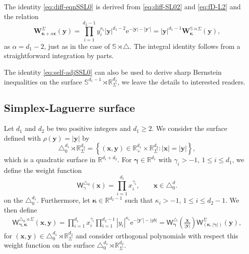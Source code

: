 \documentclass{amsart}
\theoremstyle{remark}
\def\la{{\langle}}
\def\ra{{\rangle}}
\def\d{\mathrm{d}}
\def\e{\mathrm{e}}
\def\sb{{\mathsf b}}
\def\sW{{\mathsf W}}
\def\a{{\alpha}}
\def\g{{\gamma}}
\def\k{{\kappa}}
\def\s{\sigma}
\def\la{{\langle}}
\def\ra{{\rangle}}
\def\xb{{\bm x}}
\def\yb{{\bm y}}
\def\Wb{{\bm W}}
\def\RR{{\mathbb R}}
\def\SS{{\mathbb S}}
\def\bep{{\boldsymbol{\epsilon}}}
\def\bg{{\boldsymbol{\gamma}}}
\def\bk{{\boldsymbol{\kappa}}}
\begin{document}
The identity \eqref{eq:diff-eqnSSL0} is derived from \eqref{eq:diff-SL02} and \eqref{eq:fD-L2} and the relation
$$
  \Wb_{\bk+\a \bep}^\Sigma(\yb) = \prod_{i=1}^{d_2 -1} y_i^{\k_i} |\yb|^{d_1-2} \e^{-|\yb|-|\yb'|} 
     = |\yb|^{d_1-1} \Wb_\bk^{\SS\rtimes \Sigma}(\yb),
$$
as $\a = d_1-2$, just as in the case of $\SS \rtimes \triangle$. The integral identity follows from a straightforward 
integration by parts. 

The identity \eqref{eq:self-adjSSL0} can also be used to derive sharp Bernstein inequalities
on the surface $\SS^{d_1-1}\! \rtimes \RR_\Sigma^{d_2}$, we leave the details to interested readers. 

\iffalse
\subsection{Simplex-Laguerre surface}
Let $d_1$ and $d_2$ be two positive integers and $d_1 \ge 2$. We consider the surface defined 
with $\rho(\yb) = |\yb|$ by
$$
\triangle_0^{d_1} \!\rtimes \RR_\Sigma^{d_2} = \left\{(\bm x,\bm y) \in
    \RR_+^{d_1} \times \RR_\Sigma^{d_2}: |\bm x| = |\bm y| \right\},
$$
which is a quadratic surface in $\RR^{d_1+d_2}$. For $\bg \in \RR^{d_1}$ with $\g_i > -1$, $1 \le i \le d_1$,
we define the weight function 
$$
\sW_\g^{\triangle_0}(\xb) = \prod_{i=1}^{d_1} x_i^{\g_i}, \qquad \xb \in \triangle_0^d.
$$
on the $\triangle_0^{d_1}$. Furthermore, let $\bm\kappa \in \RR^{d_2-1}$ such that $\k_i > -1$, $1 \le i \le d_2-1$. 
We then define
\begin{align*}
  \sW_{\bg, \bk}^{\triangle_0 \rtimes \Sigma} (\bm x, \bm y) 
    = \prod_{i=1}^{d_1} x_i^{\g_i} \prod_{i=1}^{d_2-1} |y_i|^{\k_i} \e^{-|\yb'|-|yb|} 
  = \sW_{\bg}^\triangle \left(\frac{\xb}{|\yb|} \right) \sW_{(\bk, |\bg|)}^\Sigma(\yb),
\end{align*}
for $(\xb, \yb) \in \triangle_0^{d_1} \rtimes \RR_\Sigma^{d_2}$ and consider orthogonal polynomials with respect 
this weight function on the surface $\triangle_0^{d_1} \!\rtimes \RR_\Sigma^{d_2}$. 

\end{document}
